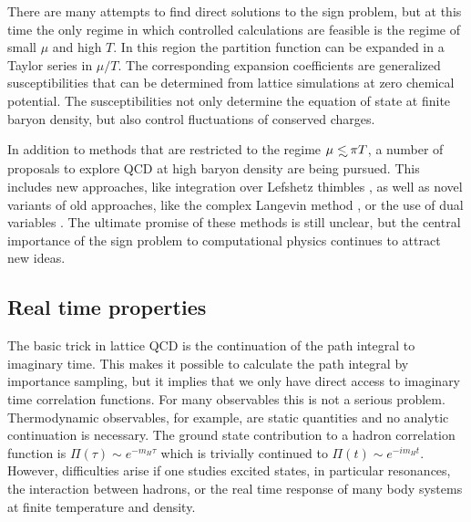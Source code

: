  There are many attempts to find direct solutions to the sign problem, 
but at this time the only regime in which controlled calculations
are feasible is the regime of small $\mu$ and high $T$. In this region
the partition function can be expanded in a Taylor series in $\mu/T$. 
The corresponding expansion coefficients are generalized susceptibilities
that can be determined from lattice simulations at zero chemical
potential. The susceptibilities not only determine the equation of state
at finite baryon density, but also control fluctuations of conserved
charges. 

In addition to methods that are restricted to the regime $\mu
\lsim \pi T$, a number of proposals to explore QCD at high baryon 
density are being pursued. This includes new approaches, like integration 
over Lefshetz thimbles \cite{Cristoforetti:2012su,Aarts:2014nxa},
as well as novel variants of old approaches, like the complex Langevin
method \cite{Aarts:2009uq,Sexty:2013ica}, or the use of dual variables 
\cite{Kloiber:2013rba}. The ultimate promise of these methods is still 
unclear, but the central importance of the sign problem to computational 
physics continues to attract new ideas. 
 

\subsection{Real time properties}
\label{sec_lQCD_real}

 The basic trick in lattice QCD is the continuation of the path 
integral to imaginary time. This makes it possible to calculate 
the path integral by importance sampling, but it implies that we 
only have direct access to imaginary time correlation functions. 
For many observables this is not a serious problem. Thermodynamic
observables, for example, are static quantities and no analytic 
continuation is necessary. The ground state contribution to a hadron 
correlation function is $\Pi(\tau)\sim e^{-m_H\tau}$ which is trivially 
continued to $\Pi(t)\sim e^{-im_Ht}$. However, difficulties arise if one 
studies excited states, in particular resonances, the interaction between
hadrons, or the real time response of many body systems at finite 
temperature and density. 


